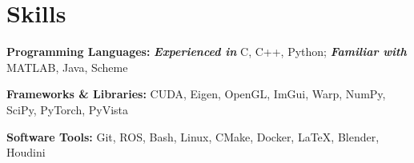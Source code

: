 \documentclass[letterpaper,11pt]{article}
\newcommand{\resumeSubHeadingListStart}{\begin{itemize}[leftmargin=0in, label={}]}
\newcommand{\resumeSubHeadingListEnd}{\end{itemize}}
\begin{document}
\section{Skills}
    \vspace{3pt}
    \resumeSubHeadingListStart
        \small{\item{
            \textbf{Programming Languages:}
            {\textit{\textbf{Experienced in}} C, C++, Python;
            \textit{\textbf{Familiar with}} MATLAB, Java, Scheme } \\
            \vspace{3pt}

            \textbf{Frameworks \& Libraries:}
            {CUDA, Eigen, OpenGL, ImGui, Warp, NumPy, SciPy, PyTorch, PyVista} \\
            \vspace{3pt}

            \textbf{Software Tools:}
            {Git, ROS, Bash, Linux, CMake, Docker, LaTeX, Blender, Houdini} \\
            \vspace{3pt}
        }}
    \resumeSubHeadingListEnd



\end{document}
